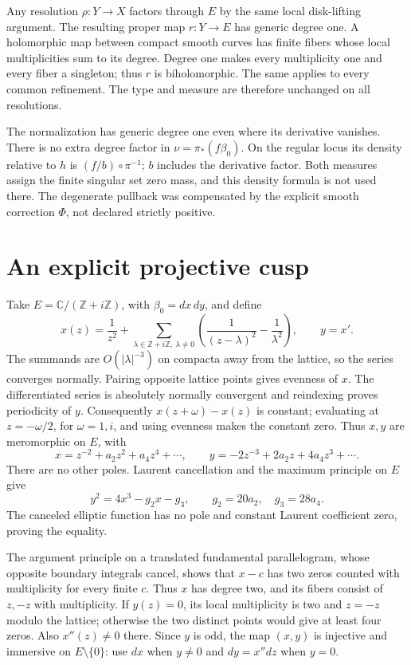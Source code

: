 \documentclass[11pt]{article}
\newcommand{\C}{\mathbb C}
\newcommand{\Z}{\mathbb Z}
\begin{document}
Any resolution $\rho:Y\to X$ factors through $E$ by the same local
disk-lifting argument. The resulting proper map $r:Y\to E$ has
generic degree one. A holomorphic map between compact smooth curves
has finite fibers whose local multiplicities sum to its degree.
Degree one makes every multiplicity one and every fiber a singleton;
thus $r$ is biholomorphic. The same applies to every common refinement.
The type and measure are therefore unchanged on all resolutions.

The normalization has generic degree one even where its derivative
vanishes. There is no extra degree factor in $\nu=\pi_*(f\beta_0)$.
On the regular locus its density relative to $h$ is
$(f/b)\circ\pi^{-1}$; $b$ includes the derivative factor.
Both measures assign the finite singular set zero mass, and this density
formula is not used there. The degenerate pullback was compensated by
the explicit smooth correction $\Phi$, not declared strictly positive.

\section{An explicit projective cusp}
Take $E=\C/(\Z+i\Z)$, with $\beta_0=dx\,dy$, and define
\[
 x(z)=\frac1{z^2}+\sum_{\lambda\in\Z+i\Z,\ \lambda\ne0}
       \left(\frac1{(z-\lambda)^2}-\frac1{\lambda^2}\right),
 \qquad y=x'.
\]
The summands are $O(|\lambda|^{-3})$ on compacta away from the
lattice, so the series converges normally. Pairing opposite lattice
points gives evenness of $x$. The differentiated series is absolutely
normally convergent and reindexing proves periodicity of $y$.
Consequently $x(z+\omega)-x(z)$ is constant; evaluating at
$z=-\omega/2$, for $\omega=1,i$, and using evenness makes the
constant zero. Thus $x,y$ are meromorphic on $E$, with
\[
 x=z^{-2}+a_2z^2+a_4z^4+\cdots,
 \qquad y=-2z^{-3}+2a_2z+4a_4z^3+\cdots.
\]
There are no other poles. Laurent cancellation and the maximum
principle on $E$ give
\begin{equation}\label{eq:cubic}
 y^2=4x^3-g_2x-g_3,
 \qquad g_2=20a_2,\quad g_3=28a_4.
\end{equation}
The canceled elliptic function has no pole and constant Laurent
coefficient zero, proving the equality.

The argument principle on a translated fundamental parallelogram,
whose opposite boundary integrals cancel, shows that $x-c$ has
two zeros counted with multiplicity for every finite $c$.
Thus $x$ has degree two, and its fibers consist of $z,-z$ with
multiplicity. If $y(z)=0$, its local multiplicity is two and
$z=-z$ modulo the lattice; otherwise the two distinct points would
give at least four zeros. Also $x''(z)\ne0$ there. Since $y$ is odd,
the map $(x,y)$ is injective and immersive on $E\setminus\{0\}$:
use $dx$ when $y\ne0$ and $dy=x''dz$ when $y=0$.
\end{document}
